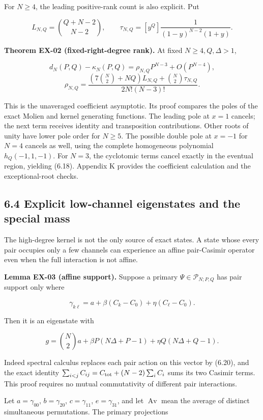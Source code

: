 For \(N\ge4\), the leading positive-rank count is also explicit. Put

\[
L_{N,Q}=\binom{Q+N-2}{N-2},\qquad
\tau_{N,Q}=[y^Q]\frac1{(1-y)^{N-2}(1+y)}.
\]

\textbf{Theorem EX-02 (fixed-right-degree rank).} At fixed \(N\ge4,Q,\Delta>1\),

\[
d_N(P,Q)-\kappa_N(P,Q)
=\rho_{N,Q}P^{N-3}+O(P^{N-4}),
\] \[
\rho_{N,Q}=
\frac{(7\binom N2+NQ)L_{N,Q}+\binom N2\tau_{N,Q}}
{2N!(N-3)!}.
\tag{6.19}
\]

This is the unaveraged coefficient asymptotic. Its proof compares the poles of the exact Molien and kernel generating functions. The leading pole at \(x=1\) cancels; the next term receives identity and transposition contributions. Other roots of unity have lower pole order for \(N\ge5\). The possible double pole at \(x=-1\) for \(N=4\) cancels as well, using the complete homogeneous polynomial \(h_Q(-1,1,-1)\). For \(N=3\), the cyclotomic terms cancel exactly in the eventual region, yielding (6.18). Appendix K provides the coefficient calculation and the exceptional-root checks.

\hypertarget{explicit-low-channel-eigenstates-and-the-special-mass}{%
\subsection{6.4 Explicit low-channel eigenstates and the special mass}\label{explicit-low-channel-eigenstates-and-the-special-mass}}

The high-degree kernel is not the only source of exact states. A state whose every pair occupies only a few channels can experience an affine pair-Casimir operator even when the full interaction is not affine.

\textbf{Lemma EX-03 (affine support).} Suppose a primary \(\Psi\in\mathcal P_{N;P,Q}\) has pair support only where

\[
\gamma_{k\ell}=a+\beta(C_k-C_0)+\eta(C_\ell-C_0).
\tag{6.20}
\]

Then it is an eigenstate with

\[
g=\binom N2a+\beta P(N\Delta+P-1)+\eta Q(N\Delta+Q-1).
\tag{6.21}
\]

Indeed spectral calculus replaces each pair action on this vector by (6.20), and the exact identity \(\sum_{i<j}C_{ij}=C_{\rm tot}+(N-2)\sum_iC_i\) sums its two Casimir terms. This proof requires no mutual commutativity of different pair interactions.

Let \(a=\gamma_{00}\), \(b=\gamma_{20}\), \(c=\gamma_{11}\), \(e=\gamma_{31}\), and let \(\operatorname{Av}\) mean the average of distinct simultaneous permutations. The primary projections

